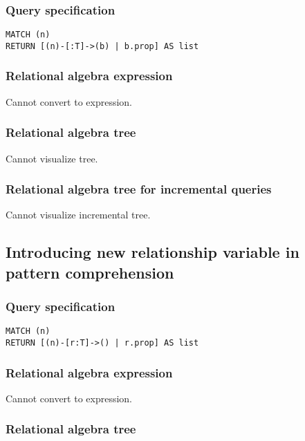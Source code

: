 \subsubsection*{Query specification}

\begin{lstlisting}
MATCH (n)
RETURN [(n)-[:T]->(b) | b.prop] AS list
\end{lstlisting}

\subsubsection*{Relational algebra expression}

Cannot convert to expression.

\subsubsection*{Relational algebra tree}

Cannot visualize tree.

\subsubsection*{Relational algebra tree for incremental queries}

Cannot visualize incremental tree.

\subsection{Introducing new relationship variable in pattern comprehension}

\subsubsection*{Query specification}

\begin{lstlisting}
MATCH (n)
RETURN [(n)-[r:T]->() | r.prop] AS list
\end{lstlisting}

\subsubsection*{Relational algebra expression}

Cannot convert to expression.

\subsubsection*{Relational algebra tree}

